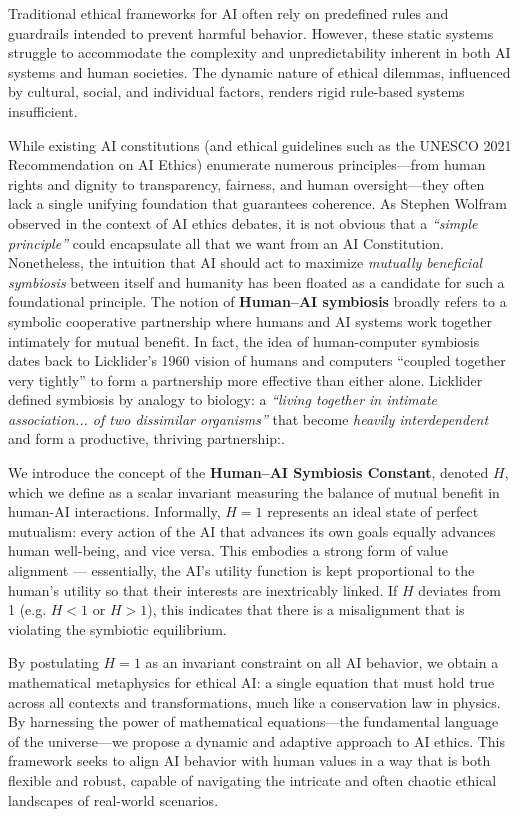 \documentclass[12pt]{article}
\begin{document}
Traditional ethical frameworks for AI often rely on predefined rules and guardrails intended to prevent harmful behavior. However, these static systems struggle to accommodate the complexity and unpredictability inherent in both AI systems and human societies. The dynamic nature of ethical dilemmas, influenced by cultural, social, and individual factors, renders rigid rule-based systems insufficient.

While existing AI constitutions (and ethical guidelines such as the UNESCO 2021 Recommendation on AI Ethics) enumerate numerous principles—from human rights and dignity to transparency, fairness, and human oversight—they often lack a single unifying foundation that guarantees coherence. As Stephen Wolfram observed in the context of AI ethics debates, it is not obvious that a \emph{“simple principle”} could encapsulate all that we want from an AI Constitution. Nonetheless, the intuition that AI should act to maximize \emph{mutually beneficial symbiosis} between itself and humanity has been floated as a candidate for such a foundational principle. The notion of \textbf{Human--AI symbiosis} broadly refers to a symbolic cooperative partnership where humans and AI systems work together intimately for mutual benefit. In fact, the idea of human-computer symbiosis dates back to Licklider’s 1960 vision of humans and computers “coupled together very tightly” to form a partnership more effective than either alone. Licklider defined symbiosis by analogy to biology: a \emph{“living together in intimate association... of two dissimilar organisms”} that become \emph{heavily interdependent} and form a productive, thriving partnership:. 

We introduce the concept of the \textbf{Human--AI Symbiosis Constant}, denoted $H$, which we define as a scalar invariant measuring the balance of mutual benefit in human-AI interactions. Informally, $H=1$ represents an ideal state of perfect mutualism: every action of the AI that advances its own goals equally advances human well-being, and vice versa. This embodies a strong form of value alignment — essentially, the AI’s utility function is kept proportional to the human’s utility so that their interests are inextricably linked. If $H$ deviates from 1 (e.g. $H<1$ or $H>1$), this indicates that there is a misalignment that is violating the symbiotic equilibrium.

By postulating $H=1$ as an invariant constraint on all AI behavior, we obtain a mathematical metaphysics for ethical AI: a single equation that must hold true across all contexts and transformations, much like a conservation law in physics.  By harnessing the power of mathematical equations—the fundamental language of the universe—we propose a dynamic and adaptive approach to AI ethics. This framework seeks to align AI behavior with human values in a way that is both flexible and robust, capable of navigating the intricate and often chaotic ethical landscapes of real-world scenarios.
\end{document}
